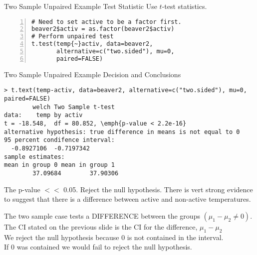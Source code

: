 \documentclass[xcolor=svgnames, 10pt, handout]{beamer}
\begin{document}
\begin{frame}[fragile]{Two Sample Unpaired Example Test Statistic}
\vfill
Use $t$-test statistics.
\vfill
\begin{Verbatim}[xleftmargin=2em, xrightmargin=1.5em, frame=single, numbers=left, label=Using P-value, framesep=0.5em, commandchars=\\\{\}]
# Need to set active to be a factor first.
beaver2$activ = as.factor(beaver2$activ)
# Perform unpaired test
t.test(temp{~}activ, data=beaver2,
       alternative=c("two.sided"), mu=0,
       paired=FALSE)
\end{Verbatim}
\vfill
\end{frame}


\begin{frame}[fragile]{Two Sample Unpaired Example Decision and Conclusions}
\begin{Verbatim}[xleftmargin=2em, xrightmargin=1.5em, frame=single, label=Using CI-value, framesep=0.5em, commandchars=\\\{\}, fontsize=\footnotesize]
> t.text(temp-activ, data=beaver2, alternative=c("two.sided"), mu=0,
paired=FALSE)
        welch Two Sample t-test
data:    temp by activ
t = -18.548,  df = 80.852, \emph{p-value < 2.2e-16}
alternative hypothesis: true difference in means is not equal to 0
95 percent condifence interval:
  -0.8927106  -0.7197342
sample estimates:
mean in group 0 mean in group 1
        37.09684        37.90306
\end{Verbatim}
The p-value $<<$ 0.05.
\vfill
Reject the null hypothesis. There is vert strong evidence to suggest that there is a difference between active and non-active temperatures. 
\end{frame}

\begin{frame}
The two sample case tests a DIFFERENCE between the groups $(\mu_1 - \mu_2 \neq 0)$. \\[0.2in]
The CI stated on the previous slide is the CI for the difference, $\mu_1 - \mu_2$\\[0.2in]
We reject the null hypothesis because 0 is not contained in the interval. \\[0.2in]
If 0 was contained we would fail to reject the null hypothesis.
%
\end{frame}
\end{document}
